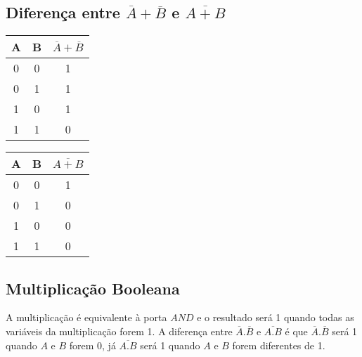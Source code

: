 \documentclass{article}
\begin{document}
		\subsection{Diferença entre $\overline{A}+\overline{B}$ e $\overline{A+B}$}
			\hspace*{2 cm}
			\begin{tabular}{|c|c|c|}
				\hline
				A & B & $\overline{A}+\overline{B}$ \\
				\hline
				0 & 0 & 1 \\
				\hline
				0 & 1 & 1 \\
				\hline
				1 & 0 & 1 \\
				\hline
				1 & 1 & 0 \\
				\hline
			\end{tabular}
			\hspace*{2 cm}
			\begin{tabular}{|c|c|c|}
				\hline
				A & B & $\overline{A+B}$ \\
				\hline
				0 & 0 & 1 \\
				\hline
				0 & 1 & 0 \\
				\hline
				1 & 0 & 0 \\
				\hline
				1 & 1 & 0 \\
				\hline
			\end{tabular}
			
		\subsection{Multiplicação Booleana}
			A multiplicação é equivalente à porta $AND$ e o resultado será 1 quando todas as variáveis da multiplicação forem 1. A diferença entre $\overline{A}.\overline{B}$ e $\overline{A.B}$ é que $\overline{A}.\overline{B}$ será 1 quando $A$ e $B$ forem 0, já $\overline{A.B}$ será 1 quando $A$ e $B$ forem diferentes de 1.\\
			
\end{document}
